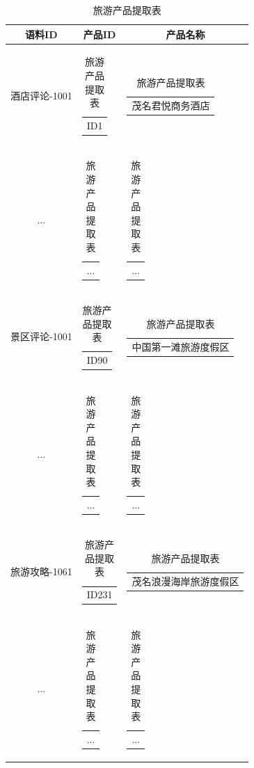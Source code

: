 \documentclass[bwprint]{gmcmthesis}
\begin{document}
\begin{center}
  \begin{longtable}{c|c|c}
    \caption{旅游产品提取表}
    \label{entity_related}\\
      \hline
      \textbf{语料ID} & \textbf{产品ID} & \textbf{产品名称} \\
      \hline
      酒店评论-1001 & \begin{tabular}[c]{@{}c@{}}
        ID1
        \end{tabular} 
        & \begin{tabular}[c]{@{}l@{}}
          茂名君悦商务酒店
        \end{tabular} \\
        ... & \begin{tabular}[c]{@{}c@{}}
          ...
        \end{tabular} 
        & \begin{tabular}[c]{@{}l@{}}
          ...
        \end{tabular} \\
        景区评论-1001 & \begin{tabular}[c]{@{}c@{}}
          ID90
          \end{tabular} 
          & \begin{tabular}[c]{@{}l@{}}
            中国第一滩旅游度假区
          \end{tabular} \\
          ... & \begin{tabular}[c]{@{}c@{}}
            ...
          \end{tabular} 
          & \begin{tabular}[c]{@{}l@{}}
            ...
          \end{tabular} \\
          旅游攻略-1061 & \begin{tabular}[c]{@{}c@{}}
            ID231
            \end{tabular} 
            & \begin{tabular}[c]{@{}l@{}}
              茂名浪漫海岸旅游度假区
            \end{tabular} \\
            ... & \begin{tabular}[c]{@{}c@{}}
              ...
            \end{tabular} 
            & \begin{tabular}[c]{@{}l@{}}
              ...
            \end{tabular} \\

\end{longtable}
\end{center}
\end{document}
